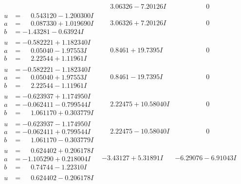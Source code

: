 \documentclass[1p]{elsarticle_modified}
\theoremstyle{definition}
\begin{document}
$$\begin{array}{c|c|c}
 & \phantom{-}3.06326 - 7.20126 I & \phantom{-0.000000 } 0 \\ \hline\begin{aligned}
u &= \phantom{-}0.543120 - 1.200300 I \\
a &= \phantom{-}0.087330 + 1.019690 I \\
b &= -1.43281 - 0.63924 I\end{aligned}
 & \phantom{-}3.06326 + 7.20126 I & \phantom{-0.000000 } 0 \\ \hline\begin{aligned}
u &= -0.582221 + 1.182340 I \\
a &= \phantom{-}0.05040 - 1.97553 I \\
b &= \phantom{-}2.22544 + 1.11961 I\end{aligned}
 & \phantom{-}0.8461 + 19.7395 I & \phantom{-0.000000 } 0 \\ \hline\begin{aligned}
u &= -0.582221 - 1.182340 I \\
a &= \phantom{-}0.05040 + 1.97553 I \\
b &= \phantom{-}2.22544 - 1.11961 I\end{aligned}
 & \phantom{-}0.8461 - 19.7395 I & \phantom{-0.000000 } 0 \\ \hline\begin{aligned}
u &= -0.623937 + 1.174950 I \\
a &= -0.062411 - 0.799544 I \\
b &= \phantom{-}1.061170 + 0.303779 I\end{aligned}
 & \phantom{-}2.22475 + 10.58040 I & \phantom{-0.000000 } 0 \\ \hline\begin{aligned}
u &= -0.623937 - 1.174950 I \\
a &= -0.062411 + 0.799544 I \\
b &= \phantom{-}1.061170 - 0.303779 I\end{aligned}
 & \phantom{-}2.22475 - 10.58040 I & \phantom{-0.000000 } 0 \\ \hline\begin{aligned}
u &= \phantom{-}0.624402 + 0.206178 I \\
a &= -1.105290 + 0.218004 I \\
b &= \phantom{-}0.74744 - 1.22310 I\end{aligned}
 & -3.43127 + 5.31891 I & -6.29076 - 6.91043 I \\ \hline\begin{aligned}
u &= \phantom{-}0.624402 - 0.206178 I \\

\end{aligned}
\end{array}$$
\end{document}
